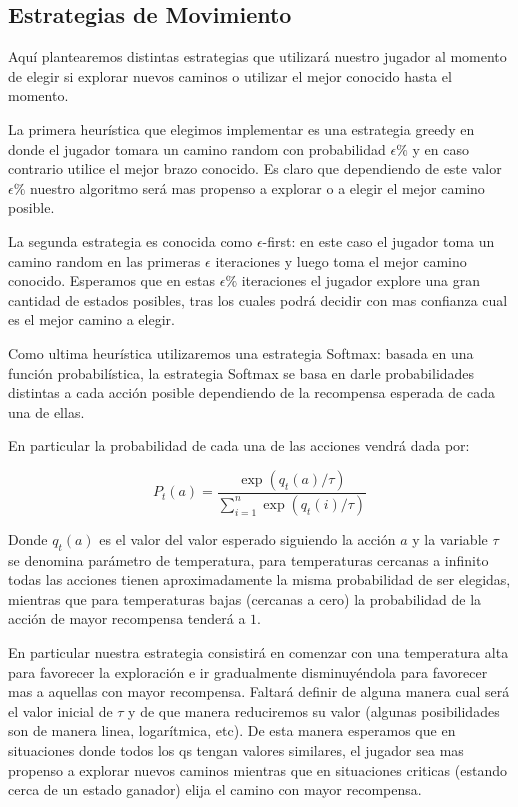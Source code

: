 \subsection{Estrategias de Movimiento}

Aquí plantearemos distintas estrategias que utilizará nuestro jugador al momento de elegir si explorar nuevos caminos o utilizar el mejor conocido hasta el momento.

La primera heurística que elegimos implementar es una estrategia greedy en donde el jugador tomara un camino random con probabilidad $\epsilon\%$ y en caso contrario utilice el mejor brazo conocido. Es claro que dependiendo de este valor $\epsilon\%$ nuestro algoritmo será mas propenso a explorar o a elegir el mejor camino posible.

La segunda estrategia es conocida como $\epsilon$-first: en este caso el jugador toma un camino random en las primeras $\epsilon$ iteraciones y luego toma el mejor camino conocido. Esperamos que en estas $\epsilon\%$ iteraciones el jugador explore una gran cantidad de estados posibles, tras los cuales podrá decidir con mas confianza cual es el mejor camino a elegir.

Como ultima heurística utilizaremos una estrategia Softmax: basada en una función probabilística, la estrategia Softmax se basa en darle probabilidades distintas a cada acción posible dependiendo de la recompensa esperada de cada una de ellas.

En particular la probabilidad de cada una de las acciones vendrá dada por:

$$P_t(a) = \frac{\exp(q_t(a)/\tau)}{\sum_{i=1}^n\exp(q_t(i)/\tau)}$$

Donde $q_t(a)$ es el valor del valor esperado siguiendo la acción $a$ y la variable $\tau$ se denomina parámetro de temperatura, para temperaturas cercanas a infinito todas las acciones tienen aproximadamente la misma probabilidad de ser elegidas, mientras que para temperaturas bajas (cercanas a cero) la probabilidad de la acción de mayor recompensa tenderá a $1$.

En particular nuestra estrategia consistirá en comenzar con una temperatura alta para favorecer la exploración e ir gradualmente disminuyéndola para favorecer mas a aquellas con mayor recompensa. Faltará definir de alguna manera cual será el valor inicial de $\tau$ y de que manera reduciremos su valor (algunas posibilidades son de manera linea, logarítmica, etc). De esta manera esperamos que en situaciones donde todos los qs tengan valores similares, el jugador sea mas propenso a explorar nuevos caminos mientras que en situaciones criticas (estando cerca de un estado ganador) elija el camino con mayor recompensa.


